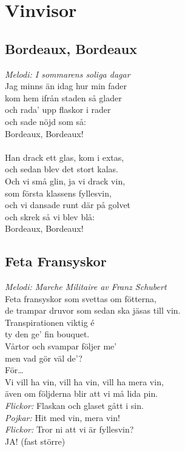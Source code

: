 \chapter{Vinvisor}
\section{Bordeaux, Bordeaux}
\textit{Melodi: I sommarens soliga dagar}
\vspace{2mm}\\
Jag minns än idag hur min fader\\
kom hem ifrån staden så glader\\
och rada’ upp flaskor i rader\\
och sade nöjd som så:\\
Bordeaux, Bordeaux!\\
\\
Han drack ett glas, kom i extas,\\
och sedan blev det stort kalas.\\
Och vi små glin, ja vi drack vin,\\
som första klassens fyllesvin,\\
och vi dansade runt där på golvet\\
och skrek så vi blev blå:\\
Bordeaux, Bordeaux!

\section{Feta Fransyskor}
\textit{Melodi: Marche Militaire av Franz Schubert}
\vspace{2mm}\\
Feta fransyskor som svettas om fötterna,\\
de trampar druvor som sedan ska jäsas till vin.\\
Transpirationen viktig é\\
ty den ge’ fin bouquet.\\
Vårtor och svampar följer me’\\
men vad gör väl de’?\\
För…\\
Vi vill ha vin, vill ha vin, vill ha mera vin,\\
även om följderna blir att vi må lida pin.\\
\textit{Flickor:} Flaskan och glaset gått i sin.\\
\textit{Pojkar:} Hit med vin, mera vin!\\
\textit{Flickor:} Tror ni att vi är fyllesvin?\\
JA! (fast större)

